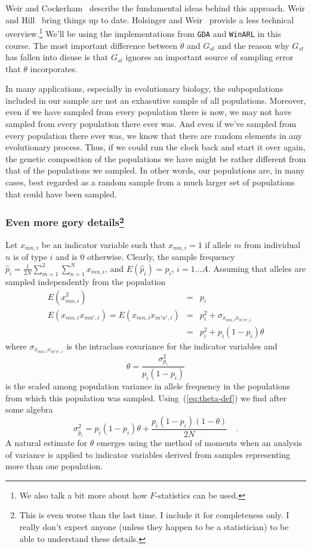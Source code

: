\documentclass[12pt]{article}
\begin{document}
Weir and Cockerham~\cite{WeirCockerham84} describe the fundamental
ideas behind this approach. Weir and Hill~\cite{Weir-Hill-2002} bring
things up to date. Holsinger and Weir~\cite{Holsinger-Weir-2009}
provide a less technical overview.\footnote{We also talk a bit more
  about how $F$-statistics can be used.} We'll be using the
implementations from {\tt GDA} and {\tt WinARL} in this course. The
most important difference between $\theta$ and $G_{st}$ and the reason
why $G_{st}$ has fallen into disuse is that $G_{st}$ ignores an
important source of sampling error that $\theta$ incorporates.

In many applications, especially in evolutionary biology, the
subpopulations included in our sample are not an exhasutive sample of
all populations. Moreover, even if we have sampled from every
population there is now, we may not have sampled from every population
there ever was. And even if we've sampled from every population there
ever was, we know that there are random elements in any evolutionary
process. Thus, if we could run the clock back and start it over again,
the genetic composition of the populations we have might be rather
different from that of the populations we sampled. In other words, our
populations are, in many cases, best regarded as a random sample from
a much larger set of populations that could have been
sampled.

\subsubsection*{Even more gory details\footnote{This is even worse
    than the last time. I include it for completeness only. I really
    don't expect anyone (unless they happen to be a statistician) to
    be able to understand these details.}}

Let $x_{mn,i}$ be an indicator variable such that $x_{mn,i} = 1$ if
allele $m$ from individual $n$ is of type $i$ and is 0
otherwise. Clearly, the sample frequency $\hat p_i =
\frac{1}{2N}\sum_{m=1}^2\sum_{n=1}^Nx_{mn,i}$, and $E(\hat p_i) =
p_i$, $i=1\dots A$. Assuming that alleles are sampled independently
from the population
\begin{eqnarray*}
E(x^2_{mn,i}) &=& p_i \\
E(x_{mn,i}x_{mn',i}) = E(x_{mn,i}x_{m'n',i}) &=& p_i^2 + \sigma_{x_{mn,i}x_{m'n',i}} \\
&=& p_i^2 + p_i(1-p_i)\theta
\end{eqnarray*}
where $\sigma_{x_{mn,i}x_{m'n',i}}$ is the intraclass covariance for
the indicator variables and 
\begin{equation}
\theta = \frac{\sigma^2_{p_i}}{p_i(1-p_i)} \label{eq:theta-def}
\end{equation}
is the scaled among population variance in allele frequency in the
populations from which this population was
sampled. Using~(\ref{eq:theta-def}) we find after some algebra
\[
\sigma^2_{\hat p_i} = p_i(1-p_i)\theta +
\frac{p_i(1-p_i)(1-\theta)}{2N} \quad .
\]
A natural estimate for $\theta$ emerges using the method of moments
when an analysis of variance is applied to indicator variables derived
from samples representing more than one
population.
\end{document}
